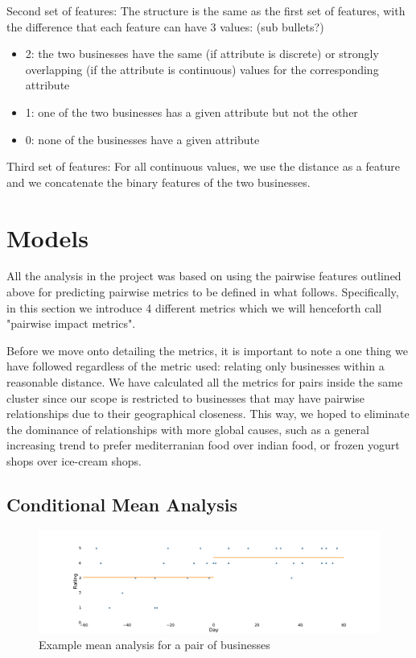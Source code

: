 \documentclass{vldb}
\begin{document}
Second set of features: The structure is the same as the first set of features, with the difference that each feature can have 3 values:
(sub bullets?)
\begin{itemize}
\item 2: the two businesses have the same (if attribute is discrete) or strongly overlapping (if the attribute is continuous) values for the corresponding attribute
\item 1: one of the two businesses has a given attribute but not the other
\item 0: none of the businesses have a given attribute
\end{itemize}

Third set of features: For all continuous values, we use the distance as a feature and we concatenate the binary features of the two businesses.


\section{Models}
All the analysis in the project was based on using the pairwise features outlined above for predicting pairwise metrics to be defined in what follows.
Specifically, in this section we introduce 4 different metrics which we will henceforth call "pairwise impact metrics".

Before we move onto detailing the metrics, it is important to note a one thing we have followed regardless of the metric used: relating only businesses within a reasonable distance. We have calculated all the metrics for pairs inside the same cluster since our scope is restricted to businesses that may have pairwise relationships due to their geographical closeness. This way, we hoped to eliminate the dominance of relationships with more global causes, such as a general increasing trend to prefer mediterranian food over indian food, or frozen yogurt shops over ice-cream shops. 


\subsection*{Conditional Mean Analysis}

\begin{figure}[h]
\centering
\includegraphics[width=\columnwidth]{mean.pdf}
\caption{Example mean analysis for a pair of businesses}
\end{figure}
\end{document}

